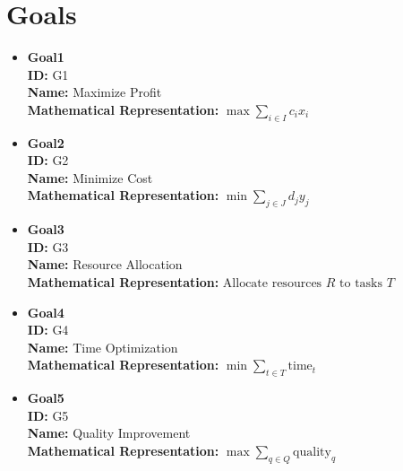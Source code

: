 \documentclass{article}
\begin{document}
\section{Goals}
\begin{itemize}
    \item \textbf{Goal1} \\
    \textbf{ID:} G1 \\
    \textbf{Name:} Maximize Profit \\
    \textbf{Mathematical Representation:} $\max \sum_{i \in I} c_i x_i$

    \item \textbf{Goal2} \\
    \textbf{ID:} G2 \\
    \textbf{Name:} Minimize Cost \\
    \textbf{Mathematical Representation:} $\min \sum_{j \in J} d_j y_j$

    \item \textbf{Goal3} \\
    \textbf{ID:} G3 \\
    \textbf{Name:} Resource Allocation \\
    \textbf{Mathematical Representation:} $\text{Allocate resources } R \text{ to tasks } T$

    \item \textbf{Goal4} \\
    \textbf{ID:} G4 \\
    \textbf{Name:} Time Optimization \\
    \textbf{Mathematical Representation:} $\min \sum_{t \in T} \text{time}_t$

    \item \textbf{Goal5} \\
    \textbf{ID:} G5 \\
    \textbf{Name:} Quality Improvement \\
    \textbf{Mathematical Representation:} $\max \sum_{q \in Q} \text{quality}_q$
\end{itemize}
\end{document}
